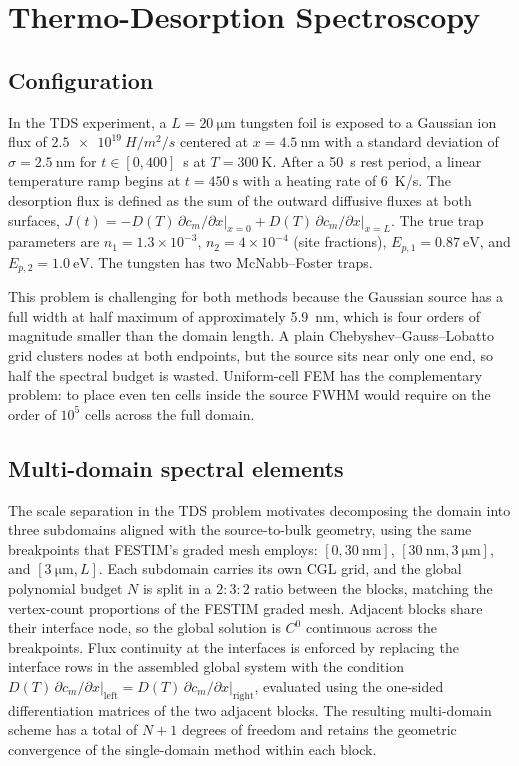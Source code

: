 \section{Thermo-Desorption Spectroscopy}\label{sec:tds}

\subsection{Configuration}\label{sec:tds-config}

In the TDS experiment, a $L = \SI{20}{\micro\meter}$ tungsten foil is exposed to a Gaussian ion flux of $\SI{2.5e19}{H/m^2/s}$ centered at $x = \SI{4.5}{\nano\meter}$ with a standard deviation of $\sigma = \SI{2.5}{\nano\meter}$ for $t \in [0, 400]$~s at $T = \SI{300}{\kelvin}$. After a \SI{50}{\second} rest period, a linear temperature ramp begins at $t = \SI{450}{\second}$ with a heating rate of \SI{6}{\kelvin/\second}. The desorption flux is defined as the sum of the outward diffusive fluxes at both surfaces, $J(t) = -D(T)\,\partial c_m/\partial x\big|_{x=0} + D(T)\,\partial c_m/\partial x\big|_{x=L}$. The true trap parameters are $n_1 = 1.3\times 10^{-3}$, $n_2 = 4\times 10^{-4}$ (site fractions), $E_{p,1} = \SI{0.87}{\electronvolt}$, and $E_{p,2} = \SI{1.0}{\electronvolt}$. The tungsten has two McNabb--Foster traps.

This problem is challenging for both methods because the Gaussian source has a full width at half maximum of approximately \SI{5.9}{\nano\meter}, which is four orders of magnitude smaller than the domain length. A plain Chebyshev--Gauss--Lobatto grid clusters nodes at both endpoints, but the source sits near only one end, so half the spectral budget is wasted. Uniform-cell FEM has the complementary problem: to place even ten cells inside the source FWHM would require on the order of $10^5$ cells across the full domain.

\subsection{Multi-domain spectral elements}\label{sec:multidomain}

The scale separation in the TDS problem motivates decomposing the domain into three subdomains aligned with the source-to-bulk geometry, using the same breakpoints that FESTIM's graded mesh employs: $[0, \SI{30}{\nano\meter}]$, $[\SI{30}{\nano\meter}, \SI{3}{\micro\meter}]$, and $[\SI{3}{\micro\meter}, L]$. Each subdomain carries its own CGL grid, and the global polynomial budget $N$ is split in a $2:3:2$ ratio between the blocks, matching the vertex-count proportions of the FESTIM graded mesh. Adjacent blocks share their interface node, so the global solution is $C^0$ continuous across the breakpoints. Flux continuity at the interfaces is enforced by replacing the interface rows in the assembled global system with the condition $D(T)\,\partial c_m/\partial x\big|_{\text{left}} = D(T)\,\partial c_m/\partial x\big|_{\text{right}}$, evaluated using the one-sided differentiation matrices of the two adjacent blocks. The resulting multi-domain scheme has a total of $N+1$ degrees of freedom and retains the geometric convergence of the single-domain method within each block.

